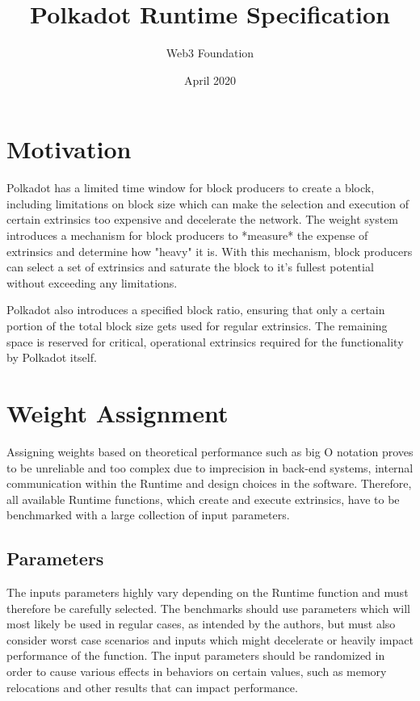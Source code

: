 \documentclass[11pt,a4paper]{article}
\begin{document}
\title{Polkadot Runtime Specification}
\author{Web3 Foundation}
\date{April 2020}
\maketitle

\section{Motivation}
Polkadot has a limited time window for block producers to create a block,
including limitations on block size which can make the selection and execution
of certain extrinsics too expensive and decelerate the network. The weight
system introduces a mechanism for block producers to *measure* the expense of
extrinsics and determine how "heavy" it is. With this mechanism, block producers
can select a set of extrinsics and saturate the block to it's fullest potential
without exceeding any limitations.
\newline

Polkadot also introduces a specified block ratio, ensuring that only a certain
portion of the total block size gets used for regular extrinsics. The remaining
space is reserved for critical, operational extrinsics required for the functionality 
by Polkadot itself.

\section{Weight Assignment}
Assigning weights based on theoretical performance such as big O notation proves to be
unreliable and too complex due to imprecision in back-end systems, internal communication
within the Runtime and design choices in the software. Therefore, all available Runtime 
functions, which create and execute extrinsics, have to be benchmarked with a large
collection of input parameters.

\subsection{Parameters}
The inputs parameters highly vary depending on the Runtime function and must therefore
be carefully selected. The benchmarks should use parameters which will most likely be
used in regular cases, as intended by the authors, but must also consider worst case
scenarios and inputs which might decelerate or heavily impact performance of the function.
The input parameters should be randomized in order to cause various effects in behaviors
on certain values, such as memory relocations and other results that can impact performance.
\end{document}
